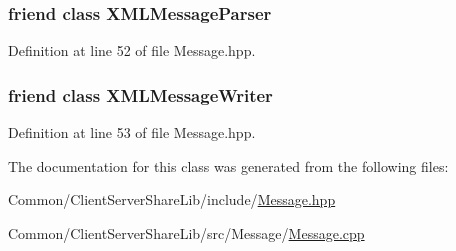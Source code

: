 \subsubsection[{X\+M\+L\+Message\+Parser}]{\setlength{\rightskip}{0pt plus 5cm}friend class {\bf X\+M\+L\+Message\+Parser}\hspace{0.3cm}{\ttfamily [friend]}}\label{class_message_a3b49efc1a5ed45b65e8fbbf7a7e7a2fa}


Definition at line 52 of file Message.\+hpp.

\hypertarget{class_message_a28ce36e58a67a190edd25dfaf58ec797}{}
\subsubsection[{X\+M\+L\+Message\+Writer}]{\setlength{\rightskip}{0pt plus 5cm}friend class {\bf X\+M\+L\+Message\+Writer}\hspace{0.3cm}{\ttfamily [friend]}}\label{class_message_a28ce36e58a67a190edd25dfaf58ec797}


Definition at line 53 of file Message.\+hpp.



The documentation for this class was generated from the following files\+:\begin{DoxyCompactItemize}
\item 
Common/\+Client\+Server\+Share\+Lib/include/\hyperlink{_message_8hpp}{Message.\+hpp}\item 
Common/\+Client\+Server\+Share\+Lib/src/\+Message/\hyperlink{_message_8cpp}{Message.\+cpp}\end{DoxyCompactItemize}
